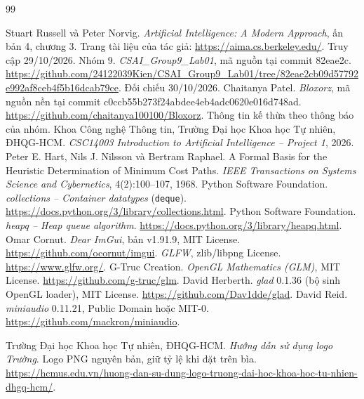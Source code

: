 \documentclass[a4paper]{article}
\begin{document}
\begin{thebibliography}{99}
 Stuart Russell và Peter Norvig. \textit{Artificial Intelligence: A Modern Approach}, ấn bản 4, chương 3. Trang tài liệu của tác giả: \url{https://aima.cs.berkeley.edu/}. Truy cập 29/10/2026.
 Nhóm 9. \textit{CSAI\_Group9\_Lab01}, mã nguồn tại commit 82eae2c. \url{https://github.com/24122039Kien/CSAI_Group9_Lab01/tree/82eae2cb09d57792e992af8ceb4f5b16dcab79ce}. Đối chiếu 30/10/2026.
 Chaitanya Patel. \textit{Bloxorz}, mã nguồn nền tại commit c0ccb55b273f24abdee4eb4adc0620e016d748ad. \url{https://github.com/chaitanya100100/Bloxorz}. Thông tin kế thừa theo thông báo của nhóm.
 Khoa Công nghệ Thông tin, Trường Đại học Khoa học Tự nhiên, ĐHQG-HCM. \textit{CSC14003 Introduction to Artificial Intelligence -- Project 1}, 2026.
 Peter E. Hart, Nils J. Nilsson và Bertram Raphael. A Formal Basis for the Heuristic Determination of Minimum Cost Paths. \textit{IEEE Transactions on Systems Science and Cybernetics}, 4(2):100--107, 1968.
 Python Software Foundation. \textit{collections -- Container datatypes} (\texttt{deque}). \url{https://docs.python.org/3/library/collections.html}.
 Python Software Foundation. \textit{heapq -- Heap queue algorithm}. \url{https://docs.python.org/3/library/heapq.html}.
 Omar Cornut. \textit{Dear ImGui}, bản v1.91.9, MIT License. \url{https://github.com/ocornut/imgui}.
 \textit{GLFW}, zlib/libpng License. \url{https://www.glfw.org/}.
 G-Truc Creation. \textit{OpenGL Mathematics (GLM)}, MIT License. \url{https://github.com/g-truc/glm}.
 David Herberth. \textit{glad} 0.1.36 (bộ sinh OpenGL loader), MIT License. \url{https://github.com/Dav1dde/glad}.
 David Reid. \textit{miniaudio} 0.11.21, Public Domain hoặc MIT-0. \url{https://github.com/mackron/miniaudio}.

 Trường Đại học Khoa học Tự nhiên, ĐHQG-HCM. \textit{Hướng dẫn sử dụng logo Trường}. Logo PNG nguyên bản, giữ tỷ lệ khi đặt trên bìa. \url{https://hcmus.edu.vn/huong-dan-su-dung-logo-truong-dai-hoc-khoa-hoc-tu-nhien-dhgq-hcm/}. 
\end{thebibliography}
\end{document}
